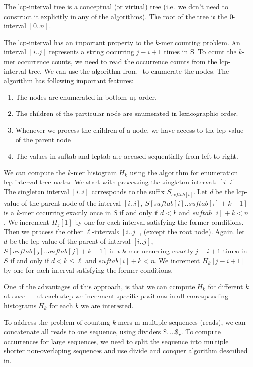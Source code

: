 The lcp-interval tree is a conceptual (or virtual) tree (i.e.\ we don't need to construct it explicitly in any of the algorithms). The root of the tree is the $0$-interval $[0..n]$.

The lcp-interval has an important property to the $k$-mer counting problem. An interval $[i..j]$ represents a string occurring $j - i + 1$ times in S\cite{tallymer}. To count the $k$-mer occurrence counts, we need to read the occurrence counts from the lcp-interval tree. We can use the algorithm from~\cite{enhancedsuffixarrays} to enumerate the nodes. The algorithm has following important features:

\begin{enumerate}
  \item The nodes are enumerated in bottom-up order.
  \item The children of the particular node are enumerated in lexicographic order.
  \item Whenever we process the children of a node, we have access to the lcp-value of the parent node %
  \item The values in suftab and lcptab are accesed sequentially from left to right.
\end{enumerate}

We can compute the $k$-mer histogram $H_k$ using the algorithm for enumeration lcp-interval tree nodes. We start with processing the singleton intervals $[i..i]$. The singleton interval $[i..i]$ corresponds to the suffix $S_{suftab[i]}$. Let $d$ be the lcp-value of the parent node of the interval $[i..i]$, $S[suftab[i]..suftab[i]+k-1]$ is a $k$-mer occurring exactly once in $S$ if and only if $d < k$ and $suftab[i]+k < n$. We increment $H_k[1]$ by one for each interval satisfying the former conditions.
Then we process the other $\ell$-intervals $[i..j]$, (except the root node). Again, let $d$ be the lcp-value of the parent of interval $[i..j]$, $S[suftab[j]..suftab[j] + k - 1]$ is a $k$-mer occurring exactly $j - i + 1$ times in $S$ if and only if $d < k \leq \ell$ and $suftab[i]+k < n$. We increment $H_k[j-i+1]$ by one for each interval satisfying the former conditions.

One of the advantages of this approach, is that we can compute $H_k$ for different $k$ at once --- at each step we increment specific positions in all corresponding histograms $H_k$ for each $k$ we are interested.

To address the problem of counting $k$-mers in multiple sequences (reads), we can concatenate all reads to one sequence, using dividers $\$_1\dots \$_r$. To compute occurrences for large sequences, we need to split the sequence into multiple shorter non-overlaping sequences and use divide and conquer algorithm described in\cite{tallymer}.

